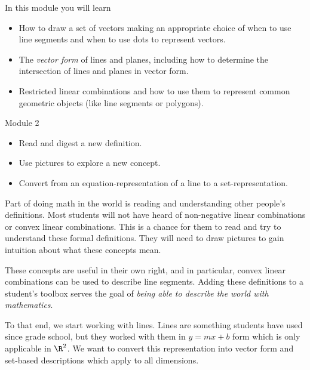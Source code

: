 \begin{module}

	In this module you will learn
	\begin{itemize}
		\item How to draw a set of vectors making an appropriate choice of when to use
			line segments and when to use dots to represent vectors.
		\item The \emph{vector form} of lines and planes, including how to determine
			the intersection of lines and planes in vector form.
		\item Restricted linear combinations and how to use them to represent common geometric
			objects (like line segments or polygons).
	\end{itemize}

	
	

\end{module}
\begin{lesson}

	Module 2

	\begin{itemize}
		\item Read and digest a new definition.

		\item Use pictures to explore a new concept.

		\item Convert from an equation-representation of a line to a set-representation.
	\end{itemize}

	 Part of doing math in the world is reading and understanding
	other people's definitions. Most students will not have heard of non-negative
	linear combinations or convex linear combinations. This is a chance for them
	to read and try to understand these formal definitions. They will need to
	draw pictures to gain intuition about what these concepts mean.

	These concepts are useful in their own right, and in particular, convex linear
	combinations can be used to describe line segments. Adding these definitions
	to a student's toolbox serves the goal of \emph{being able to describe
	the world with mathematics}.

	To that end, we start working with lines. Lines are something students have
	used since grade school, but they worked with them in $y=mx+b$ form which
	is only applicable in $\R^{2}$. We want to convert this representation
	into vector form and set-based descriptions which apply to all
	dimensions.

\end{lesson}

